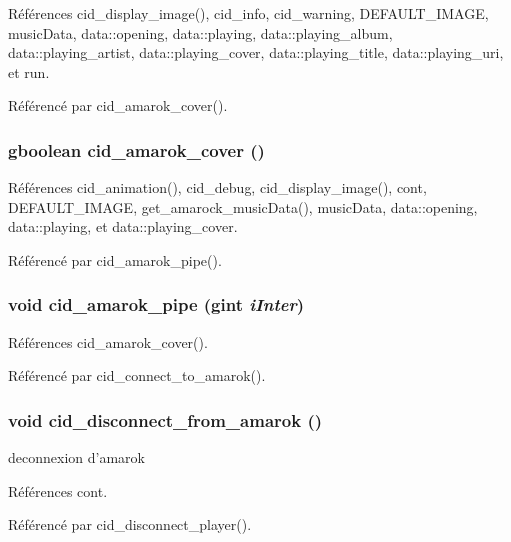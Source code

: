 Références cid\_\-display\_\-image(), cid\_\-info, cid\_\-warning, DEFAULT\_\-IMAGE, musicData, data::opening, data::playing, data::playing\_\-album, data::playing\_\-artist, data::playing\_\-cover, data::playing\_\-title, data::playing\_\-uri, et run.

Référencé par cid\_\-amarok\_\-cover().
\subsubsection{\setlength{\rightskip}{0pt plus 5cm}gboolean cid\_\-amarok\_\-cover ()}\label{cid-amarok_8c_dbbdf804cf1265ece3b1c212dd07e0c1}




Références cid\_\-animation(), cid\_\-debug, cid\_\-display\_\-image(), cont, DEFAULT\_\-IMAGE, get\_\-amarock\_\-musicData(), musicData, data::opening, data::playing, et data::playing\_\-cover.

Référencé par cid\_\-amarok\_\-pipe().
\subsubsection{\setlength{\rightskip}{0pt plus 5cm}void cid\_\-amarok\_\-pipe (gint {\em iInter})}\label{cid-amarok_8c_254a571fdd39b57762b0cfcb67ad2455}




Références cid\_\-amarok\_\-cover().

Référencé par cid\_\-connect\_\-to\_\-amarok().
\subsubsection{\setlength{\rightskip}{0pt plus 5cm}void cid\_\-disconnect\_\-from\_\-amarok ()}\label{cid-amarok_8c_e848f864ad06f0d0260ba26b4a74bb60}


deconnexion d'amarok 

Références cont.

Référencé par cid\_\-disconnect\_\-player().
